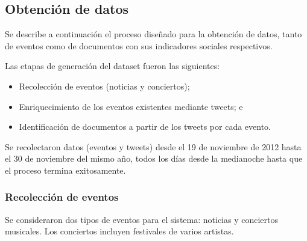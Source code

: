 \subsection{Obtención de datos}
\label{sec-4.2.1}

    Se describe a continuación el proceso diseñado para la obtención de
    datos, tanto de eventos como de documentos con sus indicadores
    sociales respectivos.

    Las etapas de generación del dataset fueron las siguientes:

\begin{itemize}
\item Recolección de eventos (noticias y conciertos);
\item Enriquecimiento de los eventos existentes mediante tweets; e
\item Identificación de documentos a partir de los tweets por cada evento.
\end{itemize}
    Se recolectaron datos (eventos y tweets) desde el 19 de noviembre de
    2012 hasta el 30 de noviembre del mismo año, todos los días
    desde la medianoche hasta que el proceso termina exitosamente.

\subsubsection{Recolección de eventos}

Se consideraron dos tipos de eventos para el sistema: noticias y
conciertos musicales. Los conciertos incluyen festivales de varios
artistas.

